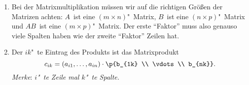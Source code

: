 \documentclass[a4paper]{article}
\begin{document}
\begin{remark}\leavevmode
    \begin{enumerate}
        \item Bei der Matrixmultiplikation müssen wir auf die richtigen Größen der Matrizen achten: $A$~ist eine $(m\times n)$"~Matrix, $B$~ist eine $(n\times p)$"~Matrix und $AB$~ist eine $(m\times p)$"~Matrix. Der erste "`Faktor"' muss also genauso viele Spalten haben wie der zweite "`Faktor"' Zeilen hat.
        \item Der $ik$"~te Eintrag des Produkts ist das Matrixprodukt
        \begin{equation*}
            c_{ik} = (a_{i1}, \dots, a_{in}) \cdot \p{b_{1k} \\ \vdots \\ b_{nk}}.
        \end{equation*}
        \emph{Merke}: \emph{$i$"~te Zeile mal $k$"~te Spalte.}
    \end{enumerate}
\end{remark}
\end{document}

